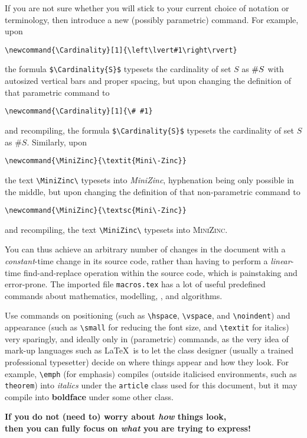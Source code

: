 If you are not sure whether you will stick to your current choice of
notation or terminology, then introduce a new (possibly parametric)
command.  For example, upon
\begin{center}
  \verb|\newcommand{\Cardinality}[1]{\left\lvert#1\right\rvert}|
\end{center}
the formula \verb|$\Cardinality{S}$| typesets the cardinality of set
$S$ as $\Cardinality{S}$ with autosized vertical bars and proper
spacing, but upon changing the definition of that parametric command
to
\begin{center}
  \verb|\newcommand{\Cardinality}[1]{\# #1}|
\end{center}
and recompiling, the formula \verb|$\Cardinality{S}$| typesets the
cardinality of set $S$ as $\#S$.
%
Similarly, upon
\begin{center}
  \verb|\newcommand{\MiniZinc}{\textit{Mini\-Zinc}}|
\end{center}
the text \verb|\MiniZinc\| typesets into \textit{MiniZinc},
hyphenation being only possible in the middle, but upon changing the
definition of that non-parametric command to
\begin{center}
  \verb|\newcommand{\MiniZinc}{\textsc{Mini\-Zinc}}|
\end{center}
and recompiling, the text \verb|\MiniZinc\| typesets into
\textsc{MiniZinc}.

You can thus achieve an arbitrary number of changes in the document
with a \emph{constant}-time change in its source code, rather than
having to perform a \emph{linear}-time find-and-replace operation
within the source code, which is painstaking and error-prone.  The
imported file \texttt{macros.tex} has a lot of useful predefined
commands about mathematics, modelling, \MiniZinc, and algorithms.

Use commands on positioning (such as \verb|\hspace|, \verb|\vspace|,
and \verb|\noindent|) and appearance (such as \verb|\small| for
reducing the font size, and \verb|\textit| for italics) very
sparingly, and ideally only in (parametric) commands, as the very idea
of mark-up languages such as \LaTeX\ is to let the class designer
(usually a trained professional typesetter) decide on where things
appear and how they look.  For example, \verb|\emph| (for emphasis)
compiles (outside italicised environments, such as \texttt{theorem})
into \textit{italics} under the \texttt{article} class used for this
document, but it may compile into \textbf{boldface} under some other
class.
\begin{center}
  \textbf{If you do not (need to) worry about \emph{how} things look, \\
    then you can fully focus on \emph{what} you are trying to
    express!}
\end{center}

